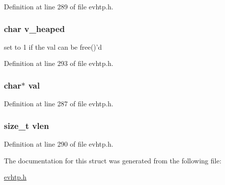 Definition at line 289 of file evhtp.h.

\hypertarget{structevhtp__kv__s_a220b69df8f7b820814ebda4c2df899d8}{
\subsubsection[{v\_\-heaped}]{\setlength{\rightskip}{0pt plus 5cm}char {\bf v\_\-heaped}}}
\label{structevhtp__kv__s_a220b69df8f7b820814ebda4c2df899d8}
set to 1 if the val can be free()'d 

Definition at line 293 of file evhtp.h.

\hypertarget{structevhtp__kv__s_a1d80a43cb41e5b550d4563dd10d302bc}{
\subsubsection[{val}]{\setlength{\rightskip}{0pt plus 5cm}char$\ast$ {\bf val}}}
\label{structevhtp__kv__s_a1d80a43cb41e5b550d4563dd10d302bc}


Definition at line 287 of file evhtp.h.

\hypertarget{structevhtp__kv__s_ac59966c92d67690ef79403b9b2feab88}{
\subsubsection[{vlen}]{\setlength{\rightskip}{0pt plus 5cm}size\_\-t {\bf vlen}}}
\label{structevhtp__kv__s_ac59966c92d67690ef79403b9b2feab88}


Definition at line 290 of file evhtp.h.



The documentation for this struct was generated from the following file:\begin{DoxyCompactItemize}
\item 
\hyperlink{evhtp_8h}{evhtp.h}\end{DoxyCompactItemize}
